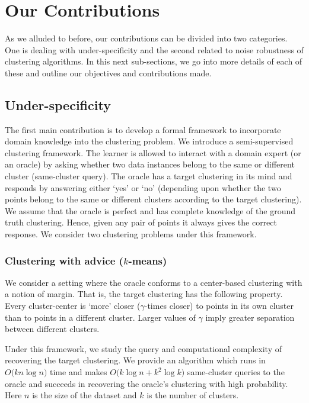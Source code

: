 \documentclass[12pt]{article}
\begin{document}
\section{Our Contributions} 
As we alluded to before, our contributions can be divided into two categories. One is dealing with under-specificity and the second related to noise robustness of clustering algorithms. In this next sub-sections, we go into more details of each of these and outline our  objectives and contributions made. 

\subsection{Under-specificity}
The first main contribution is to develop a formal framework to incorporate domain knowledge into the clustering problem. We introduce a semi-supervised clustering framework. The learner is allowed to interact with a domain expert (or an oracle) by asking whether two data instances belong to the same  or different cluster (same-cluster query). The oracle has a target clustering in its mind and responds by answering either `yes' or `no' (depending upon whether the two points belong to the same or different clusters according to the target clustering). We assume that the oracle is perfect and has complete knowledge of the ground truth clustering. Hence, given any pair of points it always gives the correct response. We consider two clustering problems under this framework.

\subsubsection*{Clustering with advice ($k$-means)}
We consider a setting where the oracle conforms to a center-based clustering with a notion of margin. That is, the target clustering has the following property.  Every cluster-center is `more' closer ($\gamma$-times closer) to points in its own cluster than to points in a different cluster. Larger values of $\gamma$ imply greater separation between different clusters. 

Under this framework, we study the query and computational complexity of recovering the target clustering. We provide an algorithm which runs in $O\big(kn\log n)$ time and makes $O\big(k\log n + k^2 \log k)$ same-cluster queries to the oracle and succeeds in recovering the oracle's clustering with high probability. Here $n$ is the size of the dataset and $k$ is the number of clusters.
\end{document}
